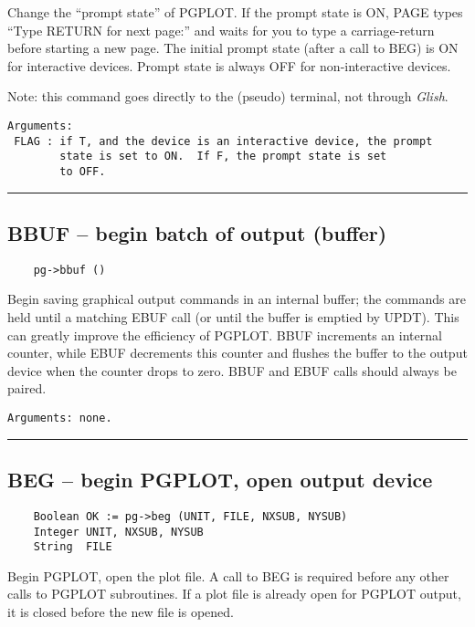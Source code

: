 Change the ``prompt state'' of PGPLOT.  If the prompt state is ON,
PAGE types ``Type RETURN for next page:'' and waits for you
to type a carriage-return before starting a new page.  The
initial prompt state (after a call to BEG) is ON for interactive
devices.  Prompt state is always OFF for non-interactive devices.

Note: this command goes directly to the (pseudo) terminal, not through
{\em Glish}.

\begin{verbatim}
Arguments:
 FLAG : if T, and the device is an interactive device, the prompt
        state is set to ON.  If F, the prompt state is set
        to OFF.
\end{verbatim}

\hrule

\subsection*{BBUF -- begin batch of output (buffer) }

\begin{verbatim}
    pg->bbuf ()
\end{verbatim}

Begin saving graphical output commands in an internal buffer; the
commands are held until a matching EBUF call (or until the buffer is
emptied by UPDT).  This can greatly improve the efficiency of PGPLOT.
BBUF increments an internal counter, while EBUF decrements this
counter and flushes the buffer to the output device when the counter
drops to zero.  BBUF and EBUF calls should always be paired.

\begin{verbatim}
Arguments: none.
\end{verbatim}

\hrule

\subsection*{BEG -- begin PGPLOT, open output device }

\begin{verbatim}
    Boolean OK := pg->beg (UNIT, FILE, NXSUB, NYSUB)
    Integer UNIT, NXSUB, NYSUB
    String  FILE
\end{verbatim}

Begin PGPLOT, open the plot file.  A call to BEG is required before
any other calls to PGPLOT subroutines.  If a plot file is already open
for PGPLOT output, it is closed before the new file is opened.

